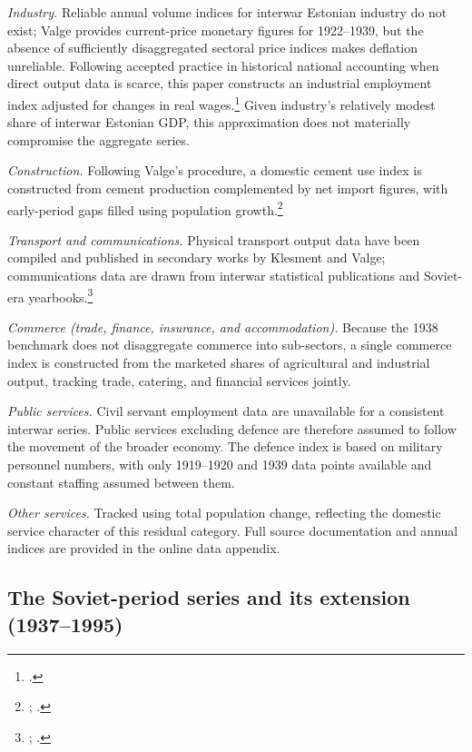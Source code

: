 \documentclass[12pt,a4paper]{article}
\begin{document}
\textit{Industry.} Reliable annual volume indices for interwar Estonian industry do not exist; Valge provides current-price monetary figures for 1922--1939, but the absence of sufficiently disaggregated sectoral price indices makes deflation unreliable. Following accepted practice in historical national accounting when direct output data is scarce, this paper constructs an industrial employment index adjusted for changes in real wages.\footnote{\autocite[22]{broadberryinmorys}.} Given industry's relatively modest share of interwar Estonian GDP, this approximation does not materially compromise the aggregate series.

\textit{Construction.} Following Valge's procedure, a domestic cement use index is constructed from cement production complemented by net import figures, with early-period gaps filled using population growth.\footnote{\autocite[Table~35]{valge2003all}; \autocite[76--78]{klesment2007}.}

\textit{Transport and communications.} Physical transport output data have been compiled and published in secondary works by Klesment and Valge; communications data are drawn from interwar statistical publications and Soviet-era yearbooks.\footnote{\autocite{klesment2007}; \autocite{valge2003all}.}

\textit{Commerce (trade, finance, insurance, and accommodation).} Because the 1938 benchmark does not disaggregate commerce into sub-sectors, a single commerce index is constructed from the marketed shares of agricultural and industrial output, tracking trade, catering, and financial services jointly.

\textit{Public services.} Civil servant employment data are unavailable for a consistent interwar series. Public services excluding defence are therefore assumed to follow the movement of the broader economy. The defence index is based on military personnel numbers, with only 1919--1920 and 1939 data points available and constant staffing assumed between them.

\textit{Other services.} Tracked using total population change, reflecting the domestic service character of this residual category. Full source documentation and annual indices are provided in the online data appendix.

\subsection{The Soviet-period series and its extension (1937--1995)}
\label{subsec:soviet}
\end{document}
